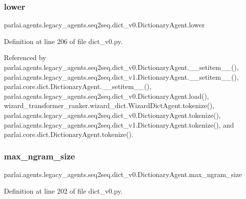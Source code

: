 \subsubsection{\texorpdfstring{lower}{lower}}
{\footnotesize\ttfamily parlai.\+agents.\+legacy\+\_\+agents.\+seq2seq.\+dict\+\_\+v0.\+Dictionary\+Agent.\+lower}



Definition at line 206 of file dict\+\_\+v0.\+py.



Referenced by parlai.\+agents.\+legacy\+\_\+agents.\+seq2seq.\+dict\+\_\+v0.\+Dictionary\+Agent.\+\_\+\+\_\+setitem\+\_\+\+\_\+(), parlai.\+agents.\+legacy\+\_\+agents.\+seq2seq.\+dict\+\_\+v1.\+Dictionary\+Agent.\+\_\+\+\_\+setitem\+\_\+\+\_\+(), parlai.\+core.\+dict.\+Dictionary\+Agent.\+\_\+\+\_\+setitem\+\_\+\+\_\+(), parlai.\+agents.\+legacy\+\_\+agents.\+seq2seq.\+dict\+\_\+v0.\+Dictionary\+Agent.\+load(), wizard\+\_\+transformer\+\_\+ranker.\+wizard\+\_\+dict.\+Wizard\+Dict\+Agent.\+tokenize(), parlai.\+agents.\+legacy\+\_\+agents.\+seq2seq.\+dict\+\_\+v0.\+Dictionary\+Agent.\+tokenize(), parlai.\+agents.\+legacy\+\_\+agents.\+seq2seq.\+dict\+\_\+v1.\+Dictionary\+Agent.\+tokenize(), and parlai.\+core.\+dict.\+Dictionary\+Agent.\+tokenize().

\mbox{\label{classparlai_1_1agents_1_1legacy__agents_1_1seq2seq_1_1dict__v0_1_1DictionaryAgent_af8e13e60813ff8b2e4bf4f46021f90f7}} 
\subsubsection{\texorpdfstring{max\+\_\+ngram\+\_\+size}{max\_ngram\_size}}
{\footnotesize\ttfamily parlai.\+agents.\+legacy\+\_\+agents.\+seq2seq.\+dict\+\_\+v0.\+Dictionary\+Agent.\+max\+\_\+ngram\+\_\+size}



Definition at line 202 of file dict\+\_\+v0.\+py.



